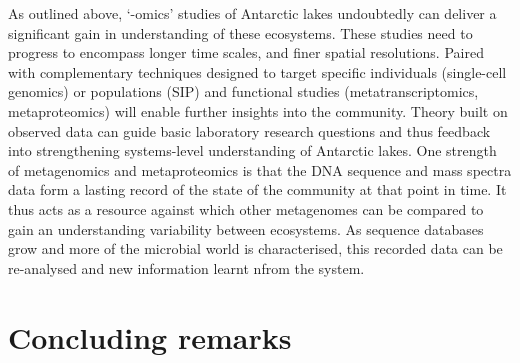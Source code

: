 As outlined above, `-omics' studies of Antarctic lakes undoubtedly can deliver a significant gain in understanding of these ecosystems.
These studies need to progress to encompass longer time scales, and finer spatial resolutions.
Paired with complementary techniques designed to target specific individuals (single-cell genomics) or populations (\ac{SIP}) and functional studies (metatranscriptomics, metaproteomics) will enable further insights into the community.
Theory built on observed data can guide basic laboratory research questions and thus feedback into strengthening systems-level understanding of Antarctic lakes.
One strength of metagenomics and metaproteomics is that the \textsc{DNA} sequence and mass spectra data form a lasting record of the state of the community at that point in time.
It thus acts as a resource against which other metagenomes can be compared to gain an understanding variability between ecosystems.
As sequence databases grow and more of the microbial world is characterised, this recorded data can be re-analysed and new information learnt nfrom the system.

%

\section{Concluding remarks}


